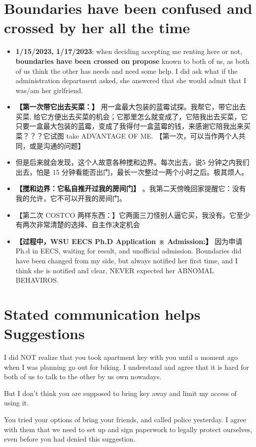 \documentclass[9pt, b5paper]{article}
\begin{document}
\section{Boundaries have been confused and crossed by her all the time}
\label{sec-8}
\begin{itemize}
\item \textbf{1/15/2023, 1/17/2023}: when deciding accepting me renting here or not, \textbf{boundaries have been crossed on propose} known to both of us, as both of us think the other has needs and need some help. I did ask what if the administration department asked, she answered that she would admit that I was/am her girlfriend.
\item \textbf{【第一次带它出去买菜：】} 用一盒最大包装的蓝霉试探。我帮它，带它出去买菜, 给它方便出去买菜的机会；它那里怎么就变成了，它陪我出去买菜，它只要一盒最大包装的蓝霉，变成了我得付一盒蓝霉的钱，来感谢它陪我出来买菜？？？它试图 take ADVANTAGE OF ME. 【第一次，可以当作两个人共同，或是沟通的问题】
\item 但是后来就会发现，这个人故意各种搅和边界。每次出去，说5 分钟之内我们出去，怕是 15 分钟看能否出门，最长一次整过一两个小时之后。极其烦人。
\item \textbf{【搅和边界：它私自推开过我的房间门】} 。我第二天傍晚回家提醒它：没有我的允许，它不可以开我的房间门。
\item 【第二次 COSTCO 两样东西：】它两面三刀怪别人逼它买，我没有。它至少有两次非常清楚的选择、自主作决定机会
\item \textbf{【过程中，WSU EECS Ph.D Application ※ Admission:】} 因为申请Ph.d in EECS, waiting for result, and unofficial admission. Boundaries did have been changed from my side, but always notified her first time, and I think she is notified and clear, NEVER expected her ABNOMAL BEHAVIROS.
\end{itemize}

\section{Stated communication helps Suggestions}
\label{sec-9}
I did NOT realize that you took apartment key with you until a moment ago when I was planning go out for biking. I understand and agree that it is hard for both of us to talk to the other by us own nowadays. 

But I don't think you are supposed to bring key away and limit my access of using it. 

You tried your options of bring your friends, and called police yesterday. I agree with them that we need to set up and sign paperwork to legally protect ourselves, even before you had denied this suggestion. 
\end{document}
